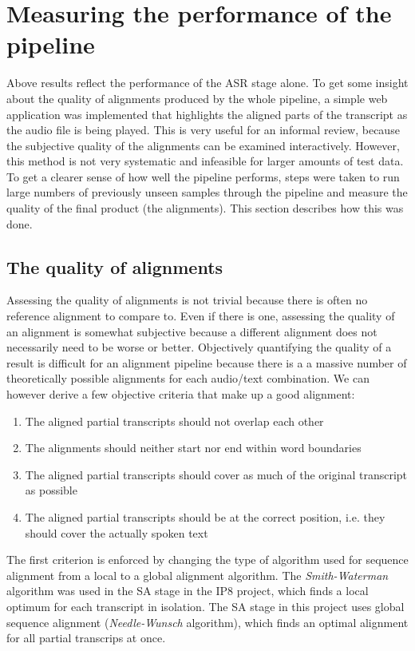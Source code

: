 \section{Measuring the performance of the pipeline}\label{e2e}

Above results reflect the performance of the \ac{ASR} stage alone. To get some insight about the quality of alignments produced by the whole pipeline, a simple web application was implemented that highlights the aligned parts of the transcript as the audio file is being played. This is very useful for an informal review, because the subjective quality of the alignments can be examined interactively. However, this method is not very systematic and infeasible for larger amounts of test data. To get a clearer sense of how well the pipeline performs, steps were taken to run large numbers of previously unseen samples through the pipeline and measure the quality of the final product (the alignments). This section describes how this was done.

\subsection{The quality of alignments}

Assessing the quality of alignments is not trivial because there is often no reference alignment to compare to. Even if there is one, assessing the quality of an alignment is somewhat subjective because a different alignment does not necessarily need to be worse or better. Objectively quantifying the quality of a result is difficult for an alignment pipeline because there is a a massive number of theoretically possible alignments for each audio/text combination. We can however derive a few objective criteria that make up a good alignment:

\begin{enumerate}
	\item The aligned partial transcripts should not overlap each other
	\item The alignments should neither start nor end within word boundaries
	\item The aligned partial transcripts should cover as much of the original transcript as possible	
	\item The aligned partial transcripts should be at the correct position, i.e. they should cover the actually spoken text
\end{enumerate}

The first criterion is enforced by changing the type of algorithm used for sequence alignment from a local to a global alignment algorithm. The \textit{Smith-Waterman} algorithm was used in the \ac{SA} stage in the IP8 project, which finds a local optimum for each transcript in isolation. The \ac{SA} stage in this project uses global sequence alignment (\textit{Needle-Wunsch} algorithm), which finds an optimal alignment for all partial transcrips at once. 

